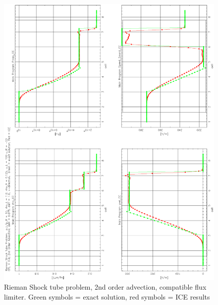 \documentclass[fleqn]{article}
\begin{document}
\begin{figure}[h]
\includegraphics[angle = 270, scale=.7]{Rieman_1.ps}
\caption{Rieman Shock tube problem, 2nd order advection, compatible flux limiter.  Green symbols = exact solution, red symbols = ICE results}
\label{fig:p_eq}
\end{figure}
\clearpage
\end{document}
